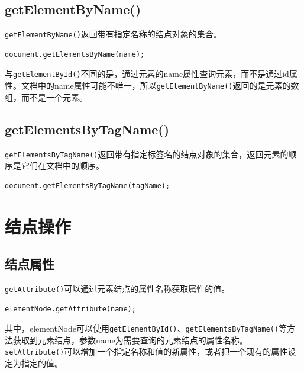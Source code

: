 \subsection{getElementByName()}

\lstinline|getElementByName()|返回带有指定名称的结点对象的集合。 \\

\begin{lstlisting}[style=htmlcssjs]
document.getElementsByName(name);
\end{lstlisting}

与\lstinline|getElementById()|不同的是，通过元素的name属性查询元素，而不是通过id属性。文档中的name属性可能不唯一，所以\lstinline|getElementByName()|返回的是元素的数组，而不是一个元素。

\subsection{getElementsByTagName()}

\lstinline|getElementsByTagName()|返回带有指定标签名的结点对象的集合，返回元素的顺序是它们在文档中的顺序。

\begin{lstlisting}[style=htmlcssjs]
document.getElementsByTagName(tagName);
\end{lstlisting}

\newpage

\section{结点操作}

\subsection{结点属性}

\lstinline|getAttribute()|可以通过元素结点的属性名称获取属性的值。 \\

\begin{lstlisting}[style=htmlcssjs]
elementNode.getAttribute(name);
\end{lstlisting}

其中，elementNode可以使用\lstinline|getElementById()|、\lstinline|getElementsByTagName()|等方法获取到元素结点，参数name为需要查询的元素结点的属性名称。 \\

\lstinline|setAttribute()|可以增加一个指定名称和值的新属性，或者把一个现有的属性设定为指定的值。 \\

